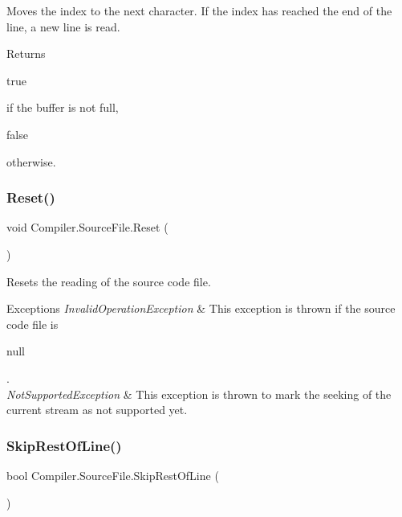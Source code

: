 Moves the index to the next character. If the index has reached the end of the line, a new line is read. \begin{DoxyReturn}{Returns}

\begin{DoxyCode}
\textcolor{keyword}{true} 
\end{DoxyCode}
 if the buffer is not full,
\begin{DoxyCode}
\textcolor{keyword}{false} 
\end{DoxyCode}
 otherwise. 
\end{DoxyReturn}
\mbox{\label{class_compiler_1_1_source_file_aa64348e54dbb048b3ec58ce3d355e014}} 
\subsubsection{\texorpdfstring{Reset()}{Reset()}}
{\footnotesize\ttfamily void Compiler.\+Source\+File.\+Reset (\begin{DoxyParamCaption}{ }\end{DoxyParamCaption})}

Resets the reading of the source code file. 
\begin{DoxyExceptions}{Exceptions}
{\em Invalid\+Operation\+Exception} & This exception is thrown if the source code file is
\begin{DoxyCode}
null 
\end{DoxyCode}
 . \\
\hline
{\em Not\+Supported\+Exception} & This exception is thrown to mark the seeking of the current stream as not supported yet. \\
\hline
\end{DoxyExceptions}
\mbox{\label{class_compiler_1_1_source_file_a236483cd300f9793eed183d32959c7bd}} 
\subsubsection{\texorpdfstring{Skip\+Rest\+Of\+Line()}{SkipRestOfLine()}}
{\footnotesize\ttfamily bool Compiler.\+Source\+File.\+Skip\+Rest\+Of\+Line (\begin{DoxyParamCaption}{ }\end{DoxyParamCaption})}

